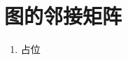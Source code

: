 \documentclass[../../main.tex]{subfiles}
\begin{document}
\section{图的邻接矩阵}
\begin{enumerate}
    \item 占位
\end{enumerate}
\end{document}
